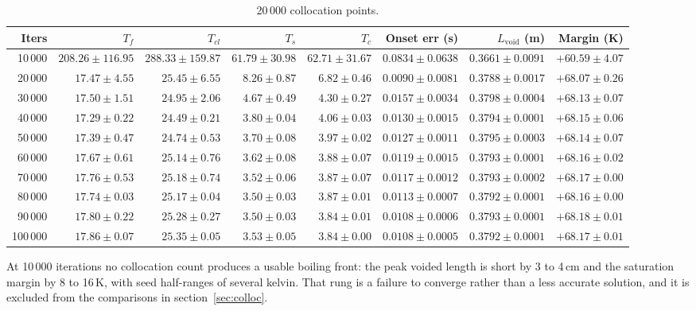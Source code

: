 \documentclass[11pt,a4paper]{article}
\begin{document}
\begin{table}[!ht]
\caption{20\,000 collocation points.}
\label{tab:lad20000}
\centering\footnotesize\setlength{\tabcolsep}{4pt}
\begin{tabular}{@{}rrrrrrrr@{}}
\toprule
Iters & $T_f$ & $T_{cl}$ & $T_s$ & $T_c$ & Onset err (s) & $L_{\mathrm{void}}$ (m) & Margin (K) \\
\midrule
10\,000 & $208.26 \pm 116.95$ & $288.33 \pm 159.87$ & $61.79 \pm 30.98$ & $62.71 \pm 31.67$ & $0.0834 \pm 0.0638$ & $0.3661 \pm 0.0091$ & $+60.59 \pm 4.07$ \\
20\,000 & $17.47 \pm 4.55$ & $25.45 \pm 6.55$ & $8.26 \pm 0.87$ & $6.82 \pm 0.46$ & $0.0090 \pm 0.0081$ & $0.3788 \pm 0.0017$ & $+68.07 \pm 0.26$ \\
30\,000 & $17.50 \pm 1.51$ & $24.95 \pm 2.06$ & $4.67 \pm 0.49$ & $4.30 \pm 0.27$ & $0.0157 \pm 0.0034$ & $0.3798 \pm 0.0004$ & $+68.13 \pm 0.07$ \\
40\,000 & $17.29 \pm 0.22$ & $24.49 \pm 0.21$ & $3.80 \pm 0.04$ & $4.06 \pm 0.03$ & $0.0130 \pm 0.0015$ & $0.3794 \pm 0.0001$ & $+68.15 \pm 0.06$ \\
50\,000 & $17.39 \pm 0.47$ & $24.74 \pm 0.53$ & $3.70 \pm 0.08$ & $3.97 \pm 0.02$ & $0.0127 \pm 0.0011$ & $0.3795 \pm 0.0003$ & $+68.14 \pm 0.07$ \\
60\,000 & $17.67 \pm 0.61$ & $25.14 \pm 0.76$ & $3.62 \pm 0.08$ & $3.88 \pm 0.07$ & $0.0119 \pm 0.0015$ & $0.3793 \pm 0.0001$ & $+68.16 \pm 0.02$ \\
70\,000 & $17.76 \pm 0.53$ & $25.18 \pm 0.74$ & $3.52 \pm 0.06$ & $3.87 \pm 0.07$ & $0.0117 \pm 0.0012$ & $0.3793 \pm 0.0002$ & $+68.17 \pm 0.00$ \\
80\,000 & $17.74 \pm 0.03$ & $25.17 \pm 0.04$ & $3.50 \pm 0.03$ & $3.87 \pm 0.01$ & $0.0113 \pm 0.0007$ & $0.3792 \pm 0.0001$ & $+68.16 \pm 0.00$ \\
90\,000 & $17.80 \pm 0.22$ & $25.28 \pm 0.27$ & $3.50 \pm 0.03$ & $3.84 \pm 0.01$ & $0.0108 \pm 0.0006$ & $0.3793 \pm 0.0001$ & $+68.18 \pm 0.01$ \\
100\,000 & $17.86 \pm 0.07$ & $25.35 \pm 0.05$ & $3.53 \pm 0.05$ & $3.84 \pm 0.00$ & $0.0108 \pm 0.0005$ & $0.3792 \pm 0.0001$ & $+68.17 \pm 0.01$ \\
\bottomrule
\end{tabular}
\end{table}

At 10\,000 iterations no collocation count produces a usable boiling front: the peak voided
length is short by 3 to 4\,cm and the saturation margin by 8 to 16\,K, with seed half-ranges
of several kelvin. That rung is a failure to converge rather than a less accurate solution,
and it is excluded from the comparisons in section~\ref{sec:colloc}.
\end{document}
